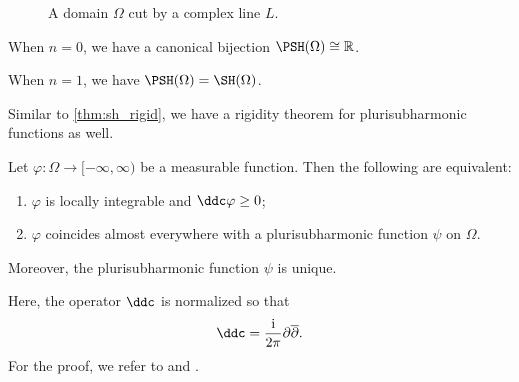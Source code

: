 \begin{figure}[ht]
\centering
{}
\caption{A domain $\Omega$ cut by a complex line $L$.}
\label{fig:psh}
\end{figure}

\begin{example}\label{ex:pshfunctions:L104}
    When $n=0$, we have a canonical bijection $\PSH(\Omega)\cong \mathbb{R}$.
\end{example}

\begin{example}
    When $n=1$, we have $\PSH(\Omega)=\SH(\Omega)$.
\end{example}

Similar to \cref{thm:sh_rigid}, we have a rigidity theorem for plurisubharmonic functions as well.
\begin{theorem}\label{thm:psh_rigid}
    Let $\varphi\colon \Omega\rightarrow [-\infty,\infty)$ be a measurable function. Then the following are equivalent:
    \begin{enumerate}
        \item\label{itm:thm:psh_rigid:1} $\varphi$ is locally integrable and $\ddc\varphi\geq 0$;
        \item\label{itm:thm:psh_rigid:2} $\varphi$ coincides almost everywhere with a plurisubharmonic function $\psi$ on $\Omega$.
    \end{enumerate}
    Moreover, the plurisubharmonic function $\psi$ is unique.
\end{theorem}
Here, the operator $\ddc$ is normalized so that
\[
\ddc =\frac{\mathrm{i}}{2\pi}\partial \overline{\partial}.
\]
For the proof, we refer to \cite[Proposition~1.43]{GZ17} and \cite[Theorem~8.2.1]{FPT}.

